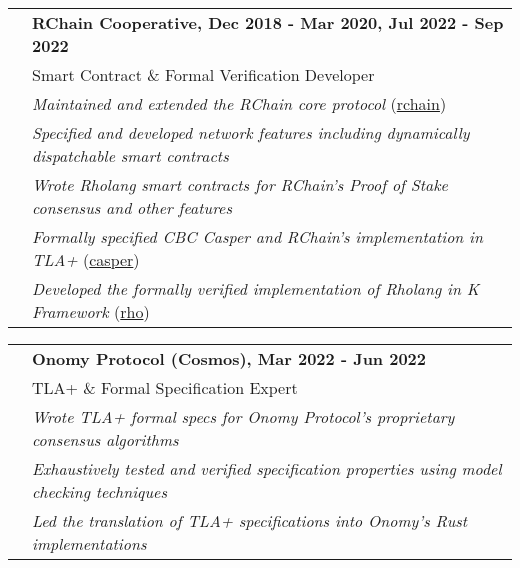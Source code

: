 \documentclass[letterpaper,10pt,oneside]{article}
\begin{document}
\vfill


\noindent \begin{tabular}{@{} l l}
 \hspace{1.1in} & \textbf{RChain Cooperative, Dec 2018 - Mar 2020,  Jul 2022 - Sep 2022} \\
 & Smart Contract \& Formal Verification Developer \\
 \hspace{1.1in} & \emph{Maintained and extended the RChain core protocol} (\href{https://github.com/rchain/rchain}{rchain}) \\
 & \emph{Specified and developed network features including dynamically dispatchable smart contracts} \\
 & \emph{Wrote Rholang smart contracts for RChain's Proof of Stake consensus and other features} \\
 & \emph{Formally specified CBC Casper and RChain's implementation in TLA+} (\href{https://github.com/Isaac-DeFrain/TLAplus/tree/master/Casper}{casper}) \\
 & \emph{Developed the formally verified implementation of Rholang in K Framework} (\href{https://github.com/Isaac-DeFrain/KFramework/tree/master/Languages/GroundedRho}{rho}) \\
\end{tabular}

\vfill


\noindent \begin{tabular}{@{} l l}
 \hspace{1.1in} & \textbf{Onomy Protocol (Cosmos), Mar 2022 - Jun 2022} \\
 & TLA+ \& Formal Specification Expert \\
 & \emph{Wrote TLA+ formal specs for Onomy Protocol's proprietary consensus algorithms} \\
 & \emph{Exhaustively tested and verified specification properties using model checking techniques} \\
 & \emph{Led the translation of TLA+ specifications into Onomy's Rust implementations} \\
\end{tabular}

\vfill

\end{document}

